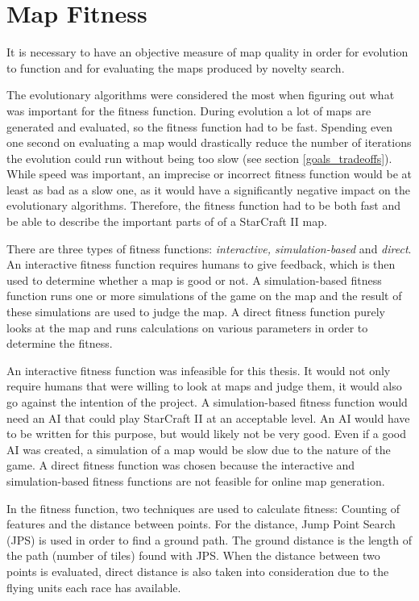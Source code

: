 \section{Map Fitness}
\label{methodology_mapfitness}
It is necessary to have an objective measure of map quality in order for evolution to function and for evaluating the maps produced by novelty search.

The evolutionary algorithms were considered the most when figuring out what was important for the fitness function. During evolution a lot of maps are generated and evaluated, so the fitness function had to be fast. Spending even one second on evaluating a map would drastically reduce the number of iterations the evolution could run without being too slow (see section \ref{goals_tradeoffs}). While speed was important, an imprecise or incorrect fitness function would be at least as bad as a slow one, as it would have a significantly negative impact on the evolutionary algorithms. Therefore, the fitness function had to be both fast and be able to describe the important parts of of a StarCraft II map.

There are three types of fitness functions\cite{Togelius2010Multiobjective}: \textit{interactive, simulation-based} and \textit{direct}. An interactive fitness function requires humans to give feedback, which is then used to determine whether a map is good or not. A simulation-based fitness function runs one or more simulations of the game on the map and the result of these simulations are used to judge the map. A direct fitness function purely looks at the map and runs calculations on various parameters in order to determine the fitness.

An interactive fitness function was infeasible for this thesis. It would not only require humans that were willing to look at maps and judge them, it would also go against the intention of the project. A simulation-based fitness function would need an AI that could play StarCraft II at an acceptable level. An AI would have to be written for this purpose, but would likely not be very good. Even if a good AI was created, a simulation of a map would be slow due to the nature of the game. A direct fitness function was chosen because the interactive and simulation-based fitness functions are not feasible for online map generation.

In the fitness function, two techniques are used to calculate fitness: Counting of features and the distance between points. For the distance, Jump Point Search\cite{harabor11a, harabor12, Podhraski2013jps} (JPS) is used in order to find a ground path. The ground distance is the length of the path (number of tiles) found with JPS. When the distance between two points is evaluated, direct distance is also taken into consideration due to the flying units each race has available.

